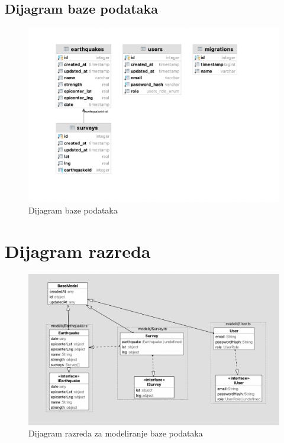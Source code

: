 			
			\subsection{Dijagram baze podataka}

				\begin{figure}[H]
					\includegraphics[width=\textwidth]{slike/tectonicDBDiagram.png} 
					\caption{Dijagram baze podataka}
					\label{fig:baza} 
				\end{figure}

			\eject
			
			
		\section{Dijagram razreda}
			
			\begin{figure}[H]
				\includegraphics[width=\textwidth]{slike/classdiagram_only_db.png} 
				\caption{Dijagram razreda za modeliranje baze podataka}
				\label{fig:uml_db} 
			\end{figure}

